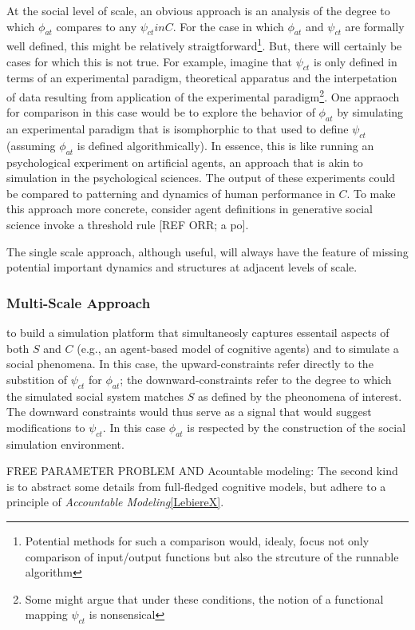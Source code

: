 \documentclass{article}
\begin{document}
At the social level of scale, an obvious approach is an analysis of the degree to which $\phi_{at}$ compares to any $\psi_{ct} in C$.  For the case in which $\phi_{at}$ and $\psi_{ct}$ are formally well defined, this might be relatively straigtforward\footnote{Potential methods for such a comparison would, idealy, focus not only comparison of input/output functions but also the strcuture of the runnable algorithm}.  But, there will certainly be cases for which this is not true.  For example, imagine that $\psi_{ct}$ is only defined in terms of an experimental paradigm, theoretical apparatus and the interpetation of data resulting from application of the experimental paradigm\footnote{Some might argue that under these conditions, the notion of a functional mapping $\psi_{ct}$ is nonsensical}.  One appraoch for comparison in this case would be to explore the behavior of $\phi_{at}$ by simulating an experimental paradigm that is isomphorphic to that used to define $\psi_{ct}$ (assuming $\phi_{at}$ is defined algorithmically).  In essence, this is like running an psychological experiment on artificial agents, an approach that is akin to simulation in the psychological sciences.  The output of these experiments could be compared to patterning and dynamics of human performance in $C$. To make this approach more concrete, consider agent definitions in generative social science invoke a threshold rule [REF ORR; a po]. 

The single scale approach, although useful, will always have the feature of missing potential important dynamics and structures at adjacent levels of scale. 
 

\subsubsection{Multi-Scale Approach}
to build a simulation platform that simultaneosly captures essentail aspects of both $S$ and $C$ (e.g., an agent-based model of cognitive agents) and to simulate a social phenomena.  In this case, the upward-constraints refer directly to the substition of  $\psi_{ct}$ for $\phi_{at}$; the downward-constraints refer to the degree to which the simulated social system matches $S$ as defined by the pheonomena of interest.  The downward constraints would thus serve as a signal that would suggest modifications to $\psi_{ct}$.  In this case $\phi_{at}$ is respected by the construction of the social simulation environment.

FREE PARAMETER PROBLEM AND Acountable modeling:  The second kind is to abstract some details from full-fledged cognitive models, but adhere to a principle of \textit{Accountable Modeling}\ref{LebiereX}.
\end{document}
